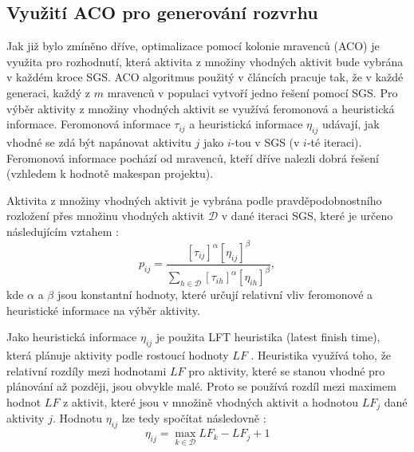 \documentclass[a4paper,12pt]{article}
\begin{document}
\subsection{Využití ACO pro generování rozvrhu}
Jak již bylo zmíněno dříve, optimalizace pomocí kolonie mravenců (ACO) je využita pro rozhodnutí, která
aktivita z množiny vhodných aktivit bude vybrána v každém kroce SGS.
ACO algoritmus použitý v článcích \cite{1027745, Merkle00antcolony} pracuje tak, že v každé generaci, každý z $m$ mravenců v populaci
vytvoří jedno řešení pomocí SGS. Pro výběr aktivity z množiny vhodných aktivit se využívá feromonová
a heuristická informace. Feromonová informace $\tau_{ij}$ a heuristická informace $\eta_{ij}$ udávají,
jak vhodné se zdá být napánovat aktivitu $j$ jako $i$-tou v SGS (v $i$-té iteraci). Feromonová informace
pochází od mravenců, kteří dříve nalezli dobrá řešení (vzhledem k hodnotě makespan projektu).

Aktivita z množiny vhodných aktivit je vybrána podle pravděpodobnostního rozložení přes 
množinu vhodných aktivit $\mathcal{D}$ v dané iteraci SGS, které je určeno následujícím
vztahem \cite{1027745, Merkle00antcolony}:
\begin{equation}
  p_{ij} = \frac{[\tau_{ij}]^\alpha[\eta_{ij}]^\beta}{\sum_{h\in\mathcal{D}}[\tau_{ih}]^\alpha[\eta_{ih}]^\beta},
\end{equation}
kde $\alpha$ a $\beta$ jsou konstantní hodnoty, které určují relativní vliv feromonové a heuristické
informace na výběr aktivity. 

Jako heuristická informace $\eta_{ij}$ je použita LFT heuristika (latest finish time),
která plánuje aktivity podle rostoucí hodnoty $LF$ \cite{1027745, Merkle00antcolony}. Heuristika využívá toho, že relativní rozdíly mezi hodnotami
$LF$ pro aktivity, které se stanou vhodné pro plánování až později, jsou obvykle malé. Proto se používá 
rozdíl mezi maximem hodnot $LF$ z aktivit, které jsou v množině vhodných aktivit a hodnotou $LF_j$ dané aktivity $j$.
Hodnotu $\eta_{ij}$ lze tedy spočítat následovně \cite{1027745, Merkle00antcolony}:
\begin{equation}
 \eta_{ij} = \max_{k\in\mathcal{D}} LF_k - LF_j + 1
\end{equation}
\end{document}
